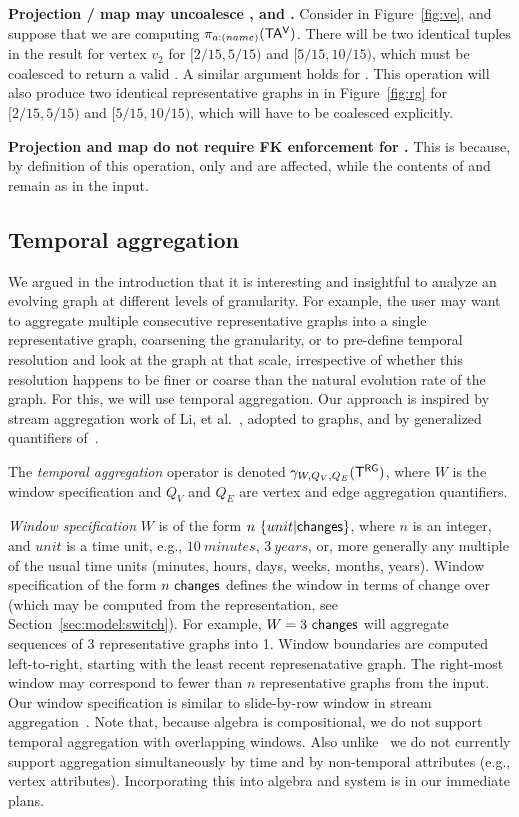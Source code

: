 {\bf Projection / map may uncoalesce \tav, \tae and \trg.}  Consider
 in Figure~\ref{fig:ve}, and suppose that we are computing
$\pi_{a:(name)} (\mathsf{TA^{V}})$.  There will be two identical tuples in the
result for vertex $v_2$ for $[2/15, 5/15)$ and $[5/15, 10/15)$, which
    must be coalesced to return a valid \tav.  A similar argument
    holds for \tae. This operation will also produce two identical
    representative graphs in \trg in Figure~\ref{fig:rg} for $[2/15,
      5/15)$ and $[5/15, 10/15)$, which will have to be coalesced
        explicitly.

{\bf Projection and map do not require FK enforcement for \tve.}  This
is because, by definition of this operation, only \tav and \tae are
affected, while the contents of \tv and \te remain as in the input.

\subsection{Temporal aggregation}
\label{sec:algebra:agg}

We argued in the introduction that it is interesting and insightful to
analyze an evolving graph at different levels of granularity.  For
example, the user may want to aggregate multiple consecutive
representative graphs into a single representative graph, coarsening
the granularity, or to pre-define temporal resolution and look at the
graph at that scale, irrespective of whether this resolution happens
to be finer or coarse than the natural evolution rate of the graph.
For this, we will use temporal aggregation.  Our approach is inspired
by stream aggregation work of Li, et al.~\cite{Li2005}, adopted to
graphs, and by generalized quantifiers of~\cite{Hsu1995}.

The {\em temporal aggregation} operator is denoted $\gamma_{W,Q_V,Q_E}
(\mathsf{T^{RG}})$, where $W$ is the window specification and $Q_V$ and $Q_E$ are
vertex and edge aggregation quantifiers.  

{\em Window specification} $W$ is of the form
$n~\{unit|\textsf{changes}\}$, where $n$ is an integer, and $unit$ is a
time unit, e.g., $10~minutes$, $3~years$, or, more generally any
multiple of the usual time units (minutes, hours, days, weeks, months,
years).  Window specification of the form $n~\textsf{changes}$ defines
the window in terms of change over \trg (which may be computed from
the \tve representation, see Section~\ref{sec:model:switch}).  For
example, $W=3~\textsf{changes}$ will aggregate sequences of 3
representative graphs into 1.  Window boundaries are computed
left-to-right, starting with the least recent represenatative graph.
The right-most window may correspond to fewer than $n$ representative
graphs from the input.
%
Our window specification is similar to slide-by-row window in stream
aggregation~\cite{Li2005}.  Note that, because \tg algebra is
compositional, we do not support temporal aggregation with overlapping
windows. Also unlike~\cite{Li2005} we do not currently support
aggregation simultaneously by time and by non-temporal attributes
(e.g., vertex attributes). Incorporating this into \tg algebra and \ql
system is in our immediate plans.

